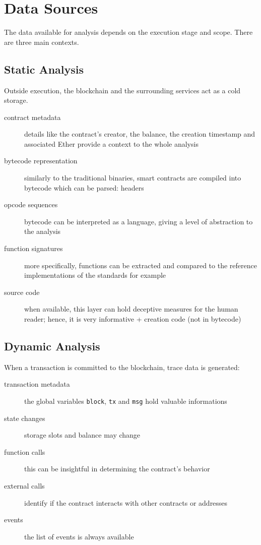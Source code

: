 \section{Data Sources} \label{sec:execution-time}

The data available for analysis depends on the execution stage and scope.
There are three main contexts.

\subsection{Static Analysis}

Outside execution, the blockchain and the surrounding services act as a cold storage.

\begin{description}
\item[contract metadata]{details like the contract's creator, the balance, the creation timestamp and associated Ether provide a context to the whole analysis}
\item[bytecode representation]{similarly to the traditional binaries, smart contracts are compiled into bytecode which can be parsed: headers}
\item[opcode sequences]{bytecode can be interpreted as a language, giving a level of abstraction to the analysis}
\item[function signatures]{more specifically, functions can be extracted and compared to the reference implementations of the standards for example}
\item[source code]{when available, this layer can hold deceptive measures for the human reader; hence, it is very informative + creation code (not in bytecode)}
\end{description}

\subsection{Dynamic Analysis}

When a transaction is committed to the blockchain, trace data is generated:

\begin{description}
\item[transaction metadata]{the global variables \lstinline[language=Solidity]{block}, \lstinline[language=Solidity]{tx} and \lstinline[language=Solidity]{msg} hold valuable informations}
\item[state changes]{storage slots and balance may change}
\item[function calls]{this can be insightful in determining the contract's behavior}
\item[external calls]{identify if the contract interacts with other contracts or addresses}
\item[events]{the list of events is always available}
\end{description}

